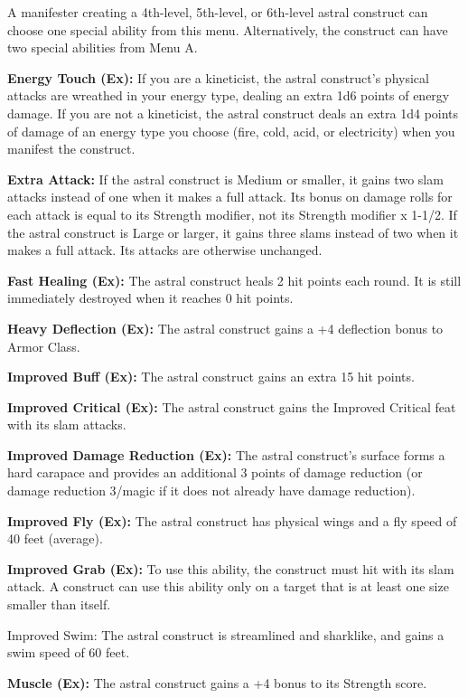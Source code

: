 \documentclass{article}
\begin{document}
A manifester creating a 4th-level, 5th-level, or 6th-level astral construct can 
choose one special ability from this menu. Alternatively, the construct can have 
two special abilities from Menu A.

\textbf{Energy Touch (Ex):} If you are a kineticist, the astral construct's physical 
attacks are wreathed in your energy type, dealing an extra 1d6 points of energy 
damage. If you are not a kineticist, the astral construct deals an extra 1d4 points 
of damage of an energy type you choose (fire, cold, acid, or electricity) when 
you manifest the construct.

\textbf{Extra Attack: }If the astral construct is Medium or smaller, it gains two 
slam attacks instead of one when it makes a full attack. Its bonus on damage rolls 
for each attack is equal to its Strength modifier, not its Strength modifier x 
1-1/2. If the astral construct is Large or larger, it gains three slams instead 
of two when it makes a full attack. Its attacks are otherwise unchanged. 

\textbf{Fast Healing (Ex):} The astral construct heals 2 hit points each round. 
It is still immediately destroyed when it reaches 0 hit points.

\textbf{Heavy Deflection (Ex):} The astral construct gains a +4 deflection bonus 
to Armor Class.

\textbf{Improved Buff (Ex):} The astral construct gains an extra 15 hit points.

\textbf{Improved Critical (Ex):} The astral construct gains the Improved Critical 
feat with its slam attacks.

\textbf{Improved Damage Reduction (Ex):} The astral construct's surface forms a 
hard carapace and provides an additional 3 points of damage reduction (or damage 
reduction 3/magic if it does not already have damage reduction).

\textbf{Improved Fly (Ex):} The astral construct has physical wings and a fly speed 
of 40 feet (average).

\textbf{Improved Grab (Ex): }To use this ability, the construct must hit with its 
slam attack. A construct can use this ability only on a target that is at least 
one size smaller than itself. 

Improved Swim: The astral construct is streamlined and sharklike, and gains a swim 
speed of 60 feet.

\textbf{Muscle (Ex):} The astral construct gains a +4 bonus to its Strength score.
\end{document}
